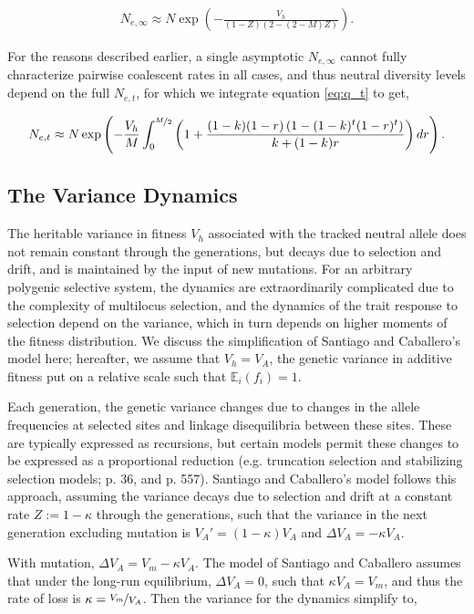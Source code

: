 \documentclass[11pt]{article}
\newcommand{\E}{\mathbb{E}}
\begin{document}
\begin{align}
  \label{eq:Ne_inf}
  N_{e,\infty} \approx N \exp\left(-\frac{V_h}{(1-Z) (2-(2-M) Z)} \right).
\end{align}

For the reasons described earlier, a single asymptotic $N_{e,\infty}$ cannot
fully characterize pairwise coalescent rates in all cases, and thus neutral
diversity levels depend on the full $N_{e,t}$, for which we integrate equation
\eqref{eq:q_t} to get,

\begin{align}
  \label{eq:net_integral}
  N_{e,t} \approx N \exp\left(-\frac{V_h}{M} \int_0^{\nicefrac{M}{2}} \left(1+\frac{(1-k) (1-r) \left(1-(1-k)^t (1-r)^t\right)}{k+(1-k)r} \right) dr \right).
\end{align}

\subsection*{The Variance Dynamics}

The heritable variance in fitness $V_h$ associated with the tracked neutral
allele does not remain constant through the generations, but decays due to
selection and drift, and is maintained by the input of new mutations. For an
arbitrary polygenic selective system, the dynamics are extraordinarily
complicated due to the complexity of multilocus selection, and the dynamics of
the trait response to selection depend on the variance, which in turn depends
on higher moments of the fitness distribution. We discuss the simplification of
Santiago and Caballero's model here; hereafter, we assume that $V_h = V_A$, the
genetic variance in additive fitness put on a relative scale such that
$\E_i(f_i) = 1$. 

Each generation, the genetic variance changes due to changes in the allele
frequencies at selected sites and linkage disequilibria between these sites.
These are typically expressed as recursions, but certain models permit these
changes to be expressed as a proportional reduction (e.g. truncation selection
and stabilizing selection models; \cite{Keightley1988-eq} p. 36, and
\cite{Walsh2018-bt} p. 557). Santiago and Caballero's model follows this
approach, assuming the variance decays due to selection and drift at a constant
rate $Z := 1-\kappa$ through the generations, such that the variance in the next
generation excluding mutation is $V_A' = (1-\kappa) V_A$ and $\Delta V_A =
-\kappa V_A$.

With mutation, $\Delta V_A = V_m - \kappa V_A$. The model of Santiago and
Caballero assumes that under the long-run equilibrium, $\Delta V_A = 0$, such
that $\kappa V_A = V_m$, and thus the rate of loss is $\kappa =
\nicefrac{V_m}{V_A}$. Then the variance for the dynamics simplify to,
\end{document}
